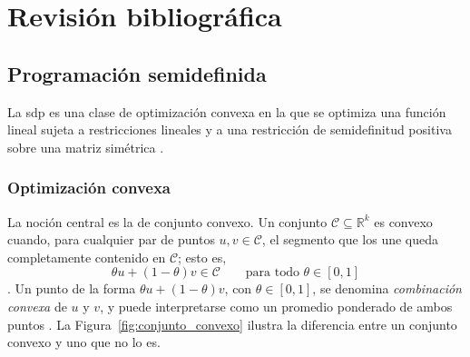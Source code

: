 \chapter{Revisión bibliográfica}
\label{ch:litRev}

\section{Programación semidefinida}
\label{sec:programacion_semidefinida}

La \acrfull{sdp} es una clase de optimización convexa en la que se optimiza una función
lineal sujeta a restricciones lineales y a una restricción de semidefinitud positiva sobre
una matriz simétrica \parencite{vandenbergheSemidefiniteProgramming1996}.

\subsection{Optimización convexa}
\label{subsec:optimizacion_convexa}

La noción central es la de conjunto convexo. Un conjunto $\mathcal{C} \subseteq \mathbb{R}^k$ es
convexo cuando, para cualquier par de puntos $u, v \in \mathcal{C}$, el segmento que los une queda
completamente contenido en $\mathcal{C}$; esto es,
\[
    \theta u + (1-\theta) v \in \mathcal{C} \qquad \text{para todo } \theta \in [0,1]
\]
\parencite[p.~23]{boydConvexOptimization2004}. Un punto de la forma $\theta u + (1-\theta) v$,
con $\theta \in [0,1]$, se denomina \textit{combinación convexa} de $u$ y $v$, y puede
interpretarse como un promedio ponderado de ambos puntos
\parencite[p.~24]{boydConvexOptimization2004}. La Figura~\ref{fig:conjunto_convexo} ilustra la
diferencia entre un conjunto convexo y uno que no lo es.

